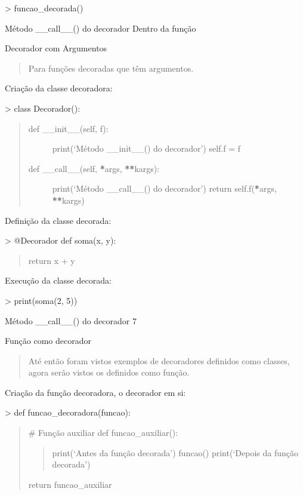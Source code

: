 \documentclass[letterpaper,10pt,brazil]{sphinxmanual}
\begin{document}
\textgreater{} funcao\_decorada()

Método \_\_call\_\_() do decorador
Dentro da função

Decorador com Argumentos
\begin{quote}

Para funções decoradas que têm argumentos.
\end{quote}

Criação da classe decoradora:

\textgreater{} class Decorador():
\begin{quote}
\begin{description}
\item[{def \_\_init\_\_(self, f):}] \leavevmode
print(‘Método \_\_init\_\_() do decorador’)
self.f = f

\item[{def \_\_call\_\_(self, {\color{red}\bfseries{}*}args, {\color{red}\bfseries{}**}kargs):}] \leavevmode
print(‘Método \_\_call\_\_() do decorador’)
return self.f({\color{red}\bfseries{}*}args, {\color{red}\bfseries{}**}kargs)

\end{description}
\end{quote}

Definição da classe decorada:

\textgreater{} @Decorador
def soma(x, y):
\begin{quote}

return x + y
\end{quote}

Execução da classe decorada:

\textgreater{} print(soma(2, 5))

Método \_\_call\_\_() do decorador
7

Função como decorador
\begin{quote}

Até então foram vistos exemplos de decoradores definidos como classes, agora serão vistos os definidos como função.
\end{quote}

Criação da função decoradora, o decorador em si:

\textgreater{} def funcao\_decoradora(funcao):
\begin{quote}

\# Função auxiliar
def funcao\_auxiliar():
\begin{quote}

print(‘Antes da função decorada’)
funcao()
print(‘Depois da função decorada’)
\end{quote}

return funcao\_auxiliar
\end{quote}
\end{document}
